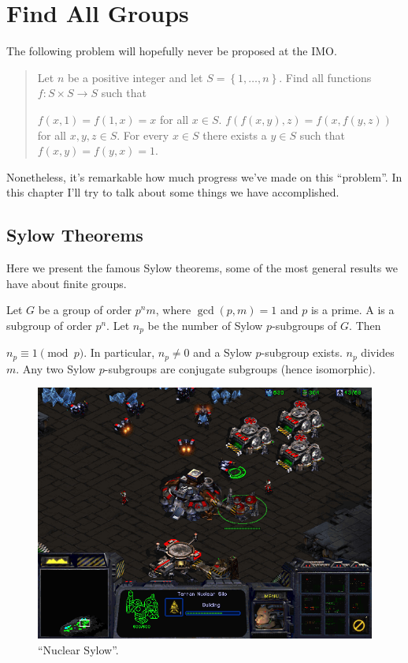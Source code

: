 \chapter{Find All Groups}
The following problem will hopefully never be proposed at the IMO.
\begin{quote}
	Let $n$ be a positive integer and let $S = \left\{ 1,\dots,n \right\}$.
	Find all functions $f : S \times S \to S$ such that
	\begin{enumerate}[(a)]
		\ii $f(x,1)=f(1,x)=x$ for all $x \in S$.
		\ii $f(f(x,y),z)=f(x,f(y,z))$ for all $x,y,z \in S$.
		\ii For every $x \in S$ there exists a $y \in S$ such that $f(x,y)=f(y,x)=1$.
	\end{enumerate}
\end{quote}
Nonetheless, it's remarkable how much progress we've made on this ``problem''.
In this chapter I'll try to talk about some things we have accomplished.

\section{Sylow Theorems}
Here we present the famous Sylow theorems, some of the most
general results we have about finite groups.

\begin{theorem}
	Let $G$ be a group of order $p^n m$,
	where $\gcd(p,m)=1$ and $p$ is a prime.
	A  is a subgroup of order $p^n$.
	Let $n_p$ be the number of Sylow $p$-subgroups of $G$.
	Then
	\begin{enumerate}[(a)]
		\ii $n_p \equiv 1 \pmod p$. In particular, $n_p \neq 0$ and
		a Sylow $p$-subgroup exists.
		\ii $n_p$ divides $m$.
		\ii Any two Sylow $p$-subgroups are conjugate subgroups (hence isomorphic).
	\end{enumerate}
\end{theorem}

\begin{figure}[ht]
	\centering
	\includegraphics[scale=0.6]{media/starcraft-nuclear-silo.png}
	\caption{``Nuclear Sylow''.}
\end{figure}



